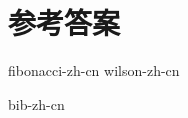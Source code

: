 \documentclass[b5paper]{ctexart}
\begin{document}
\ifx\wholebook\relax \else
\section{参考答案}
\shipoutAnswer

{fibonacci-zh-cn}
{wilson-zh-cn}

\begin{thebibliography}{99}
{bib-zh-cn}
\end{thebibliography}

\expandafter\enddocument
\fi
\end{document}
